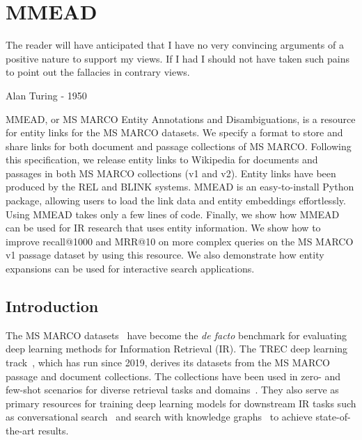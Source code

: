 \chapter{MMEAD}
\label{ch:mmead}

\epigraph{The reader will have anticipated that I have no very convincing
	arguments of a positive nature to support my views. If I had I should not
	have taken such pains to point out the fallacies in contrary views.}{Alan Turing - 1950}

\begin{Abstract}
	\begin{changemargin}{1cm}{1cm}
		MMEAD, or MS MARCO Entity Annotations and Disambiguations, is a resource for entity links for the MS MARCO datasets. We specify a format to store and share links for both document and passage collections of MS MARCO. Following this specification, we release entity links to Wikipedia for documents and passages in both MS MARCO collections (v1 and v2). Entity links have been produced by the REL and BLINK systems. 
		MMEAD is an easy-to-install Python package, allowing users to load the link data and entity embeddings effortlessly. Using MMEAD takes only a few lines of code. Finally, we show how MMEAD can be used for IR research that uses entity information. We show how to improve recall@1000 and MRR@10 on more complex queries on the MS MARCO v1 passage dataset by using this resource. We also demonstrate how entity expansions can be used for interactive search applications. 
	\end{changemargin}
\end{Abstract}

\section{Introduction} 
The MS MARCO datasets~\citep{msmarco} have become the \emph{de facto} benchmark for evaluating deep learning methods for Information Retrieval (IR). The TREC deep learning track~\citep{trec-dl}, which has run since 2019, derives its datasets from the MS MARCO passage and document collections. The collections have been used in zero- and few-shot scenarios for diverse retrieval tasks and domains~\citep{thakur2021beir, thakur2022domain, xu2022laprador}. They also serve as primary resources for training deep learning models for downstream IR tasks such as conversational search~\citep{dalton2021cast} and search with knowledge graphs~\citep{Gerritse:2022:EMBERT} to achieve state-of-the-art results.

